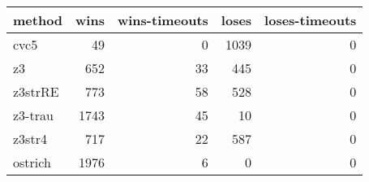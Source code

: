 \begin{tabular}{lrrrr}
\hline
 method   &   wins &   wins-timeouts &   loses &   loses-timeouts \\
\hline
 cvc5     &     49 &               0 &    1039 &                0 \\
 z3       &    652 &              33 &     445 &                0 \\
 z3strRE  &    773 &              58 &     528 &                0 \\
 z3-trau  &   1743 &              45 &      10 &                0 \\
 z3str4   &    717 &              22 &     587 &                0 \\
 ostrich  &   1976 &               6 &       0 &                0 \\
\hline
\end{tabular}

